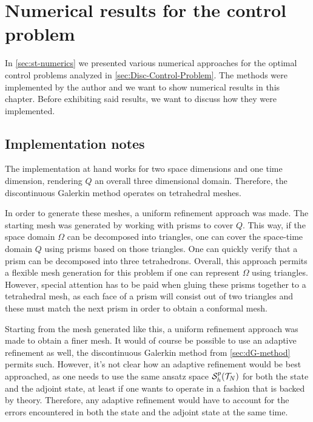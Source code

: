 \documentclass[../thesis.tex]{subfiles}
\begin{document}
\chapter{Numerical results for the control problem}
\label{sec:numerical-results}
In \cref{sec:st-numerics} we presented various numerical approaches for the optimal control problems analyzed in \cref{sec:Disc-Control-Problem}.
The methods were implemented by the author and we want to show numerical results in this chapter.
Before exhibiting said results, we want to discuss how they were implemented.
\section{Implementation notes}
The implementation at hand works for two space dimensions and one time dimension, rendering $Q$ an overall three dimensional domain.
Therefore, the discontinuous Galerkin method operates on tetrahedral meshes.

In order to generate these meshes, a uniform refinement approach was made. The starting mesh was generated by working with prisms to cover $Q$. This way, if the space domain $\Omega$ can be decomposed into triangles, one can cover the space-time domain $Q$ using prisms based on those triangles.
One can quickly verify that a prism can be decomposed into three tetrahedrons. Overall, this approach permits a flexible mesh generation for this problem if one can represent $\Omega$ using triangles.
However, special attention has to be paid when gluing these prisms together to a tetrahedral mesh, as each face of a prism will consist out of two triangles and these must match the next prism in order to obtain a conformal mesh.

Starting from the mesh generated like this, a uniform refinement approach was made to obtain a finer mesh. It would of course be possible to use an adaptive refinement as well, the discontinuous Galerkin method from \cref{sec:dG-method} permits such.
However, it's not clear how an adaptive refinement would be best approached, as one needs to use the same ansatz space $\mathcal{S}_h^p(\mathcal{T}_N)$ for both the state and the adjoint state, at least if one wants to operate in a fashion that is backed by theory. Therefore, any adaptive refinement would have to account for the errors encountered in both the state and the adjoint state at the same time.
\end{document}
